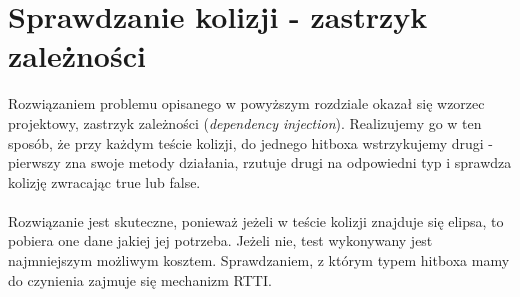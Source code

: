 	\section{Sprawdzanie kolizji - zastrzyk zależności}
		\indent \indent Rozwiązaniem problemu opisanego w powyższym rozdziale okazał się wzorzec projektowy, zastrzyk zależności (\emph{dependency injection}). Realizujemy go w ten sposób, że przy każdym teście kolizji, do jednego hitboxa wstrzykujemy drugi - pierwszy zna swoje metody działania, rzutuje drugi na odpowiedni typ i sprawdza kolizję zwracając true lub false.\\\\
		\indent Rozwiązanie jest skuteczne, ponieważ jeżeli w teście kolizji znajduje się elipsa, to pobiera one dane jakiej jej potrzeba. Jeżeli nie, test wykonywany jest najmniejszym możliwym kosztem. Sprawdzaniem, z którym typem hitboxa mamy do czynienia zajmuje się mechanizm RTTI.